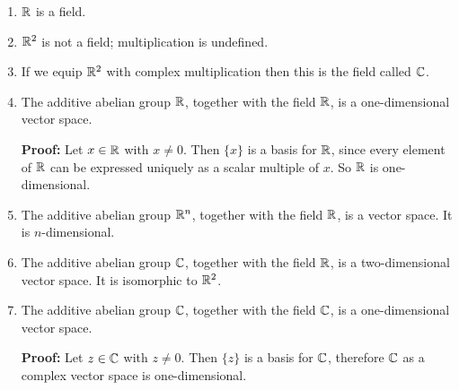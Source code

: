 \begin{enumerate}
\item $\mathbb{R}$ is a field.

\item $\mathbb{R}^2$ is not a field; multiplication is undefined.

\item If we equip $\mathbb{R}^2$ with complex multiplication then this is the field called $\mathbb{C}$.

\item The additive abelian group $\mathbb{R}$, together with the field $\mathbb{R}$, is a one-dimensional vector space.

  {\bf Proof:} Let $x \in \mathbb{R}$ with $x \neq 0$. Then $\{x\}$ is a basis for $\mathbb{R}$, since every element of $\mathbb{R}$ can
  be expressed uniquely as a scalar multiple of $x$. So $\mathbb{R}$ is one-dimensional.

\item The additive abelian group $\mathbb{R}^n$, together with the field $\mathbb{R}$, is a vector space. It is $n$-dimensional.

\item The additive abelian group $\mathbb{C}$, together with the field $\mathbb{R}$, is a two-dimensional vector
  space. It is isomorphic to $\mathbb{R}^2$.

\item The additive abelian group $\mathbb{C}$, together with the field $\mathbb{C}$, is a one-dimensional vector space.

  {\bf Proof:} Let $z \in \mathbb{C}$ with $z \neq 0$. Then $\{z\}$ is a basis for $\mathbb{C}$, therefore $\mathbb{C}$ as a
  complex vector space is one-dimensional.
\end{enumerate}

\newpage
